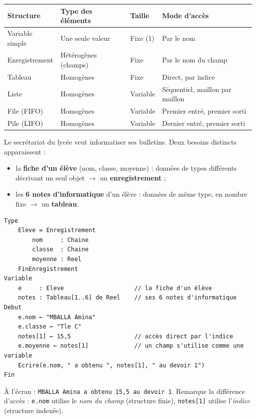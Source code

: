 \documentclass[11pt]{article}
\begin{document}
\begin{center}
\begin{tabularx}{\linewidth}{|l|X|X|X|}
\hline
\rowcolor{popblueL}
\textbf{Structure} & \textbf{Type des éléments} & \textbf{Taille} & \textbf{Mode d'accès} \\
\hline
Variable simple & Une seule valeur & Fixe (1) & Par le nom \\
\hline
Enregistrement & Hétérogènes (champs) & Fixe & Par le nom du champ \\
\hline
Tableau & Homogènes & Fixe & Direct, par indice \\
\hline
Liste & Homogènes & Variable & Séquentiel, maillon par maillon \\
\hline
File (FIFO) & Homogènes & Variable & Premier entré, premier sorti \\
\hline
Pile (LIFO) & Homogènes & Variable & Dernier entré, premier sorti \\
\hline
\end{tabularx}
\end{center}

\begin{exemplebox}
Le secrétariat du lycée veut informatiser ses bulletins. Deux besoins distincts apparaissent :
\begin{itemize}
\item la \textbf{fiche d'un élève} (nom, classe, moyenne) : données de types différents décrivant un seul objet $\rightarrow$ un \textbf{enregistrement} ;
\item les \textbf{6 notes d'informatique} d'un élève : données de même type, en nombre fixe $\rightarrow$ un \textbf{tableau}.
\end{itemize}
\begin{lstlisting}
Type
    Eleve = Enregistrement
        nom     : Chaine
        classe  : Chaine
        moyenne : Reel
    FinEnregistrement
Variable
    e     : Eleve                    // la fiche d'un élève
    notes : Tableau[1..6] de Reel    // ses 6 notes d'informatique
Debut
    e.nom ← "MBALLA Amina"
    e.classe ← "Tle C"
    notes[1] ← 15,5                  // accès direct par l'indice
    e.moyenne ← notes[1]             // un champ s'utilise comme une variable
    Ecrire(e.nom, " a obtenu ", notes[1], " au devoir 1")
Fin
\end{lstlisting}
À l'écran : \texttt{MBALLA Amina a obtenu 15,5 au devoir 1}. Remarque la différence d'accès : \texttt{e.nom} utilise le \emph{nom du champ} (structure finie), \texttt{notes[1]} utilise l'\emph{indice} (structure indexée).
\end{exemplebox}
\end{document}
